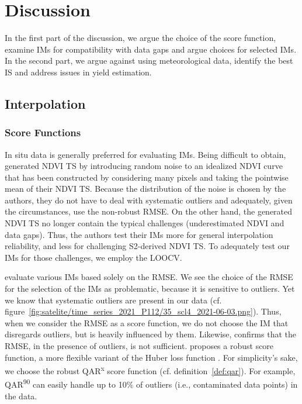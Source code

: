 \chapter{Discussion}\label{sec:discussion}
    In the first part of the discussion, we argue the choice of the score function, examine IMs for compatibility with data gaps and argue choices for selected IMs. In the second part, we argue against using meteorological data, identify the best IS and address issues in yield estimation.


\section{Interpolation}{ \label{sec:discussion_itpl}
    \subsection{Score Functions}{
        In situ data is generally preferred for evaluating IMs. Being difficult to obtain, \cite{liHighqualityVegetationIndex2021} generated NDVI TS by introducing random noise to an idealized NDVI curve that has been constructed by considering many pixels and taking the pointwise mean of their NDVI TS. Because the distribution of the noise is chosen by the authors, they do not have to deal with systematic outliers and adequately, given the circumstances, use the non-robust RMSE. On the other hand, the generated NDVI TS no longer contain the typical challenges (underestimated NDVI and data gaps). Thus, the authors test their IMs more for general interpolation reliability, and less for challenging S2-derived NDVI TS. To adequately test our IMs for those challenges, we employ the LOOCV.

        \cite{caiPerformanceSmoothingMethods2017a} evaluate various IMs based solely on the RMSE. We see the choice of the RMSE for the selection of the IMs as problematic, because it is sensitive to outliers. Yet we know that systematic outliers are present in our data (cf. figure~\ref{fig:satelite/time_series_2021_P112/35_scl4_2021-06-03.png}). Thus, when we consider the RMSE as a score function, we do not choose the IM that disregards outliers, but is heavily influenced by them. Likewise, \cite{liemohnRMSENotEnough2021} confirms that the RMSE, in the presence of outliers, is not sufficient. \cite{barronGeneralAdaptiveRobust2019} proposes a robust score function, a more flexible variant of the Huber loss function \citep{huberRobustEstimationLocation1964}. For simplicity's sake, we choose the robust QAR\textsuperscript{x} score function (cf. definition~\ref{def:qar}). For example, QAR\textsuperscript{90} can easily handle up to 10\% of outliers (i.e., contaminated data points) in the data.                 
    }

}
